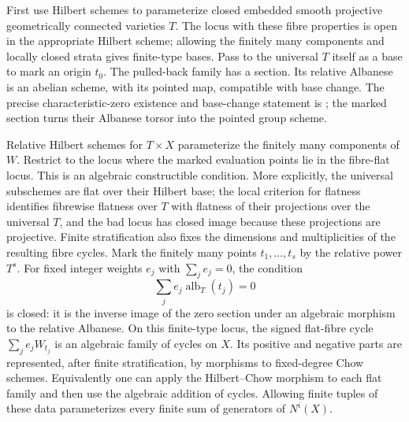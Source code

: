 First use Hilbert schemes to parameterize closed embedded
smooth projective geometrically connected varieties $T$.
The locus with these fibre properties is open in the
appropriate Hilbert scheme; allowing the finitely many
components and locally closed strata gives finite-type bases.
Pass to the universal $T$ itself as a base to mark an origin
$t_0$. The pulled-back family has a section. Its relative
Albanese is an abelian scheme, with its pointed map, compatible
with base change. The precise characteristic-zero existence
and base-change statement is
\citet[Theorem 2.2]{cyJavanpeykarMathur2022}; the marked section
turns their Albanese torsor into the pointed group scheme.

Relative Hilbert schemes for $T\times X$ parameterize the
finitely many components of $W$. Restrict to the locus where
the marked evaluation points lie in the fibre-flat locus.
This is an algebraic constructible condition. More explicitly,
the universal subschemes are flat over their Hilbert base;
the local criterion for flatness identifies fibrewise flatness
over $T$ with flatness of their projections over the universal
$T$, and the bad locus has closed image because these
projections are projective. Finite stratification also fixes
the dimensions and multiplicities of the resulting fibre
cycles. Mark the finitely many points $t_1,\ldots,t_s$ by
the relative power $T^s$. For fixed integer weights $e_j$
with $\sum_j e_j=0$, the condition
\[
            \sum_j e_j\operatorname{alb}_{T}(t_j)=0
\]
is closed: it is the inverse image of the zero section under
an algebraic morphism to the relative Albanese. On this
finite-type locus, the signed flat-fibre cycle
$\sum_j e_jW_{t_j}$ is an algebraic family of cycles on $X$.
Its positive and negative parts are represented, after finite
stratification, by morphisms to fixed-degree Chow schemes.
Equivalently one can apply the Hilbert--Chow morphism to each
flat family and then use the algebraic addition of cycles.
Allowing finite tuples of these data parameterizes every
finite sum of generators of $N^i(X)$.

